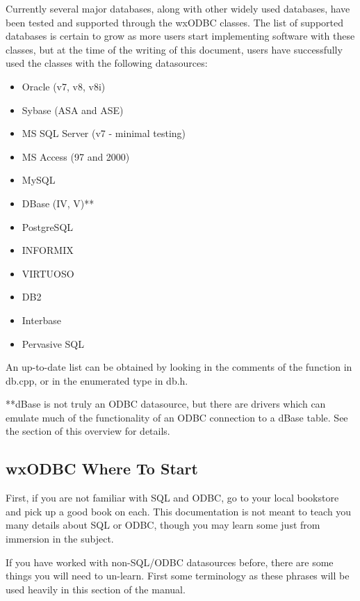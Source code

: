 Currently several major databases, along with other widely used databases, 
have been tested and supported through the wxODBC classes.  The list of 
supported databases is certain to grow as more users start implementing 
software with these classes, but at the time of the writing of this document, 
users have successfully used the classes with the following datasources:

\begin{itemize}\itemsep=0pt
\item Oracle (v7, v8, v8i)
\item Sybase (ASA and ASE)
\item MS SQL Server (v7 - minimal testing)
\item MS Access (97 and 2000)
\item MySQL
\item DBase (IV, V)**
\item PostgreSQL
\item INFORMIX
\item VIRTUOSO
\item DB2
\item Interbase
\item Pervasive SQL
\end{itemize}

An up-to-date list can be obtained by looking in the comments of the function 
 in db.cpp, or in the enumerated type 
 in db.h.

**dBase is not truly an ODBC datasource, but there are drivers which can 
emulate much of the functionality of an ODBC connection to a dBase table.  
See the  section of this 
overview for details.


\subsection{wxODBC Where To Start}\label{wxodbcwheretostart}

First, if you are not familiar with SQL and ODBC, go to your local bookstore 
and pick up a good book on each.  This documentation is not meant to teach 
you many details about SQL or ODBC, though you may learn some just from 
immersion in the subject.

If you have worked with non-SQL/ODBC datasources before, there are some 
things you will need to un-learn.  First some terminology as these phrases will 
be used heavily in this section of the manual.


